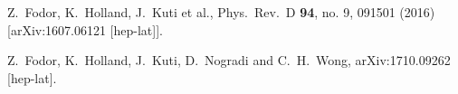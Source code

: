\documentclass[epj]{webofc}
\begin{document}
\begin{thebibliography}{99}
  Z.~Fodor, K.~Holland, J.~Kuti et al.,
  Phys.\ Rev.\ D {\bf 94}, no. 9, 091501 (2016)
  [arXiv:1607.06121 [hep-lat]].



  Z.~Fodor, K.~Holland, J.~Kuti, D.~Nogradi and C.~H.~Wong,
  arXiv:1710.09262 [hep-lat].

\end{thebibliography}
\end{document}
